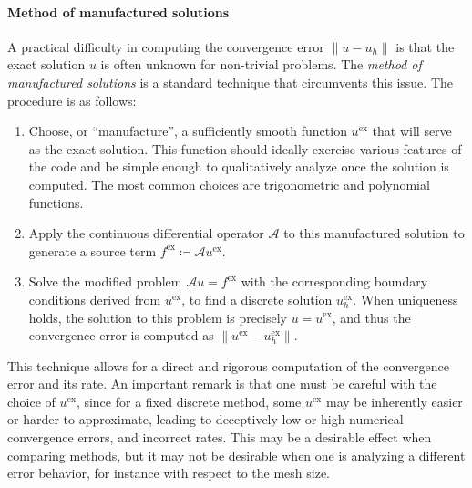 \paragraph{Method of manufactured solutions} A practical difficulty in computing the convergence error $\|u - u_h\|$ is that the exact solution $u$ is often unknown for non-trivial problems. The \emph{method of manufactured solutions} is a standard technique that circumvents this issue. The procedure is as follows:
\begin{enumerate}
    \item Choose, or ``manufacture'', a sufficiently smooth function $u^{\text{ex}}$ that will serve as the exact solution. This function should ideally exercise various features of the code and be simple enough to qualitatively analyze once the solution is computed. The most common choices are trigonometric and polynomial functions.
    \item Apply the continuous differential operator $\mathcal{A}$ to this manufactured solution to generate a source term $f^{\text{ex}} \coloneqq \mathcal{A}u^{\text{ex}}$.
    \item Solve the modified problem $\mathcal{A}u = f^{\text{ex}}$ with the corresponding boundary conditions derived from $u^{\text{ex}}$, to find a discrete solution $u^{\text{ex}}_h$. When uniqueness holds, the solution to this problem is precisely $u=u^{\text{ex}}$, and thus the convergence error is computed as $\|u^{\text{ex}} - u^{\text{ex}}_h\|$.
\end{enumerate}
This technique allows for a direct and rigorous computation of the convergence error and its rate. An important remark is that one must be careful with the choice of $u^{\text{ex}}$, since for a fixed discrete method, some $u^{\text{ex}}$ may be inherently easier or harder to approximate, leading to deceptively low or high numerical convergence errors, and incorrect rates. This may be a desirable effect when comparing methods, but it may not be desirable when one is analyzing a different error behavior, for instance with respect to the mesh size.

